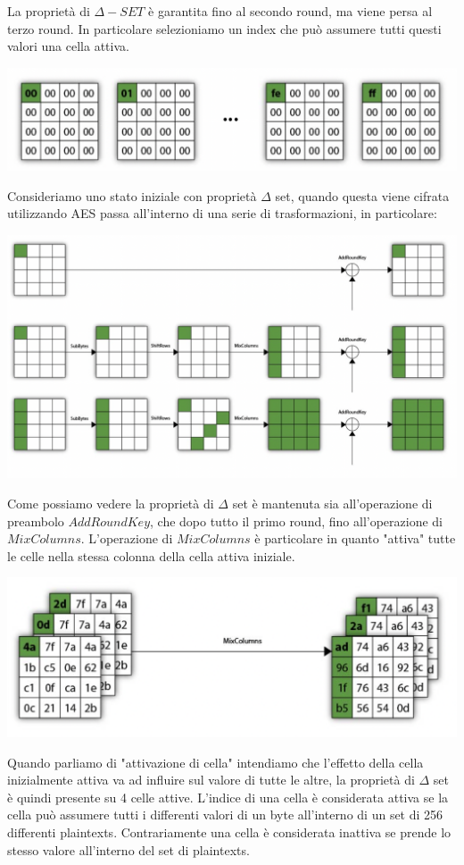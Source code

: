 \documentclass[11pt, oneside]{article}   	%
\begin{document}
La proprietà di  $\Delta - SET$ è garantita fino al secondo round, ma viene persa al terzo round.
In particolare selezioniamo un index che può assumere tutti questi valori una cella attiva. 
\begin{center}
\includegraphics[scale= 0.4]{deltaset}
\end{center}
Consideriamo uno stato iniziale con proprietà $\Delta$ set, quando questa viene cifrata utilizzando AES passa all'interno di una serie di trasformazioni, in particolare:
\begin{center}
\includegraphics[scale= 0.4]{deltaset2}
\end{center}
Come possiamo vedere la proprietà di $\Delta$ set è mantenuta sia all'operazione di preambolo $AddRoundKey$, che dopo tutto il primo round, fino all'operazione di $MixColumns$. L'operazione di $MixColumns$ è particolare in quanto "attiva" tutte le celle nella stessa colonna della cella attiva iniziale.
\begin{center}
\includegraphics[scale= 0.3]{deltaset3}
\end{center}
Quando parliamo di "attivazione di cella" intendiamo che l'effetto della cella inizialmente attiva va ad influire sul valore di tutte le altre, la proprietà di $\Delta$ set è quindi presente su 4 celle attive. L'indice di una cella è considerata attiva se la cella può assumere tutti i differenti valori di un byte all'interno di un set di 256 differenti plaintexts. Contrariamente una cella è considerata inattiva se prende lo stesso valore all'interno del set di plaintexts.
\end{document}
